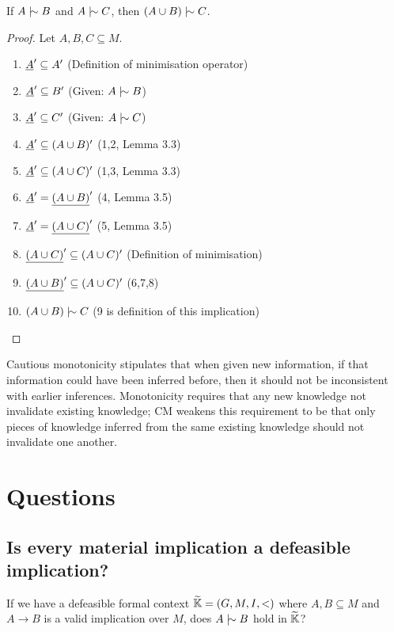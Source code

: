 \documentclass[11pt]{article}
\begin{document}

\begin{theorem}
  If $A \twiddle B$ and $A \twiddle C$, then $(A \cup B) \twiddle C$.
\end{theorem}

\begin{proof}
  Let $A, B, C \subseteq M$.
  \begin{enumerate}
    \item $\underline{A}' \subseteq A'$ \hfill (Definition of minimisation operator)
    \item $\underline{A}' \subseteq B'$ \hfill (Given: $A \twiddle B$)
    \item $\underline{A}' \subseteq C'$ \hfill (Given: $A \twiddle C$)
    \item $\underline{A}' \subseteq (A \cup B)' $ \hfill (1,2, Lemma 3.3)
    \item $\underline{A}' \subseteq (A \cup C)' $ \hfill (1,3, Lemma 3.3)
    \item $\underline{A}' = \underline{(A\cup B)}'$ \hfill (4, Lemma 3.5)
    \item $\underline{A}' = \underline{(A \cup C)}'$ \hfill (5, Lemma 3.5)
    \item $\underline{(A\cup C)}' \subseteq (A \cup C)'$ \hfill (Definition of minimisation)
    \item $\underline{(A\cup B)}' \subseteq (A\cup C)'$ \hfill (6,7,8)
    \item $(A\cup B) \twiddle C$ \hfill (9 is definition of this implication)
  \end{enumerate}
\end{proof}

\begin{remark}
  Cautious monotonicity stipulates that when given new information, if that information could have been inferred before, then it should not be inconsistent with earlier inferences. Monotonicity requires that any new knowledge not invalidate existing knowledge; CM weakens this requirement to be that only pieces of knowledge inferred from the same existing knowledge should not invalidate one another.
\end{remark}


\section{Questions}
\subsection{Is every material implication a defeasible implication?}
If we have a defeasible formal context $\widetilde{\mathbb{K}} = (G,M,I,<)$ where $A,B\subseteq M$ and $A\rightarrow B$ is a valid implication over $M$, does $A \twiddle B$ hold in $\widetilde{\mathbb{K}}$?


\end{document}
